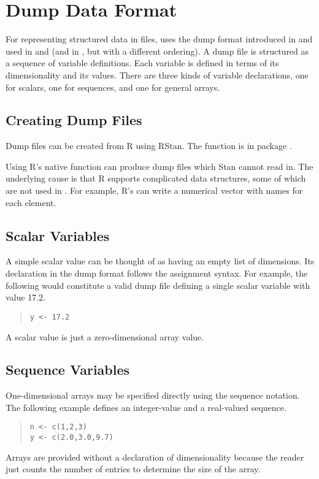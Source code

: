 \chapter{Dump Data Format}\label{dump.chapter}

\noindent 
For representing structured data in files, \CmdStan uses the dump format
introduced in \SPLUS and used in \R and \JAGS (and in \BUGS, but with
a different ordering).   A dump file is structured as a sequence of
variable definitions.  Each variable is defined in terms of its
dimensionality and its values.   There are three kinds of variable
declarations, one for scalars, one for sequences, and one for general
arrays.

\section{Creating Dump Files}

Dump files can be created from R using RStan.  The function is
 in package .

Using R's native  function can produce dump files which
Stan cannot read in.  The underlying cause is that R supports
complicated data structures, some of which are not used in \CmdStan.
For example, R's  can write a numerical vector with names
for each element.

\section{Scalar Variables}

A simple scalar value can be thought of as having an empty list of
dimensions.  Its declaration in the dump format follows the \SPLUS
assignment syntax.  For example, the following would constitute a
valid dump file defining a single scalar variable  with value
17.2.
%
\begin{quote}
\begin{Verbatim}
y <- 17.2
\end{Verbatim}
\end{quote}
%
A scalar value is just a zero-dimensional array value.


\section{Sequence Variables}\label{sequence-variables.section}

One-dimensional arrays may be specified directly using the \SPLUS
sequence notation.  The following example defines an integer-value and
a real-valued sequence.
%
\begin{quote}
\begin{Verbatim}
n <- c(1,2,3)
y <- c(2.0,3.0,9.7)
\end{Verbatim}
\end{quote}
%
Arrays are provided without a declaration of dimensionality because
the reader just counts the number of entries to determine the size of
the array.

